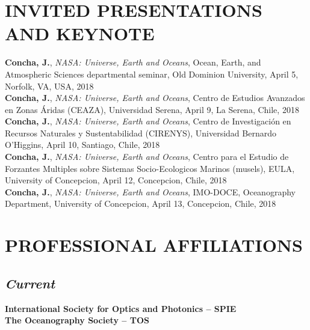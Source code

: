\documentclass[11pt]{res}
\begin{document}
\begin{resume}
\section{INVITED PRESENTATIONS AND KEYNOTE}
\vspace{0.1in}
{\bf Concha, J.}, {\it NASA: Universe, Earth and Oceans}, Ocean, Earth, and Atmospheric Sciences departmental seminar, Old Dominion University, April 5, Norfolk, VA, USA, 2018
\vspace{0.1in}\\
{\bf Concha, J.}, {\it NASA: Universe, Earth and Oceans}, Centro de Estudios Avanzados en Zonas Áridas (CEAZA), Universidad Serena, April 9, La Serena, Chile, 2018
\vspace{0.1in}\\
{\bf Concha, J.}, {\it NASA: Universe, Earth and Oceans}, Centro de Investigación en Recursos Naturales y Sustentabilidad (CIRENYS), Universidad Bernardo O'Higgins, April 10, Santiago, Chile, 2018
\vspace{0.1in}\\
{\bf Concha, J.}, {\it NASA: Universe, Earth and Oceans}, Centro para el Estudio de Forzantes Multiples sobre Sistemas Socio-Ecologicos Marinos (musels), EULA, University of Concepcion, April 12, Concepcion, Chile, 2018
\vspace{0.1in}\\
{\bf Concha, J.}, {\it NASA: Universe, Earth and Oceans}, IMO-DOCE, Oceanography Department, University of Concepcion, April 13, Concepcion, Chile, 2018
\vspace{0.1in}\\
\vspace{-0.1in}
\section{PROFESSIONAL AFFILIATIONS}
\vspace{-0.1in}
\subsection{\it Current}
\vspace{-0.2in}
{\bf International Society for Optics and Photonics -- SPIE}
\vspace{0.1in}\\
{\bf The Oceanography Society -- TOS}
\vspace{-0.2in}

\end{resume}
\end{document}
